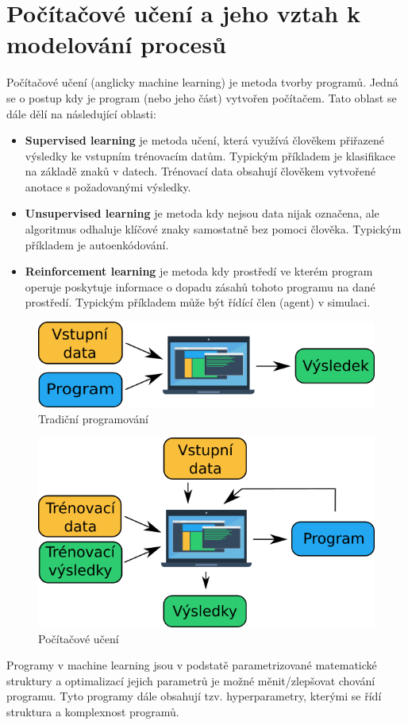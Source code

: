 \section{Počítačové učení a jeho vztah k modelování procesů}
\label{sec:ML}
Počítačové učení (anglicky machine learning) je metoda tvorby programů. Jedná
se o postup kdy je program (nebo jeho část) vytvořen počítačem. Tato oblast se
dále dělí na následující oblasti:
\begin{itemize}
  \item
    \textbf{Supervised learning} je metoda učení, která využívá člověkem
    přiřazené výsledky ke vstupním trénovacím datům. Typickým příkladem je
    klasifikace na základě znaků v datech. Trénovací data obsahují člověkem
    vytvořené anotace s požadovanými výsledky.
  \item
    \textbf{Unsupervised learning} je metoda kdy nejsou data nijak označena,
    ale algoritmus odhaluje klíčové znaky samostatně bez pomoci člověka.
    Typickým příkladem je autoenkódování.
  \item
    \textbf{Reinforcement learning} je metoda kdy prostředí ve kterém program
    operuje poskytuje informace o dopadu zásahů tohoto programu na dané
    prostředí. Typickým příkladem může být řídící člen (agent) v simulaci.
\end{itemize}
\begin{figure}[h] \centering \capstart
  \includegraphics[scale=0.6]{figures/traditional_prog_cz}
  \caption{Tradiční programování}
  \label{fig:traditional_prog}
\end{figure}

\begin{figure}[h] \centering \capstart
  \includegraphics[scale=0.6]{figures/machine_learning_cz}
  \caption{Počítačové učení}
  \label{fig:machine_learning}
\end{figure}
Programy v machine learning jsou v podstatě
parametrizované matematické struktury a optimalizací jejich parametrů je možné
měnit/zlepšovat chování programu. Tyto programy dále obsahují tzv.
hyperparametry, kterými se řídí struktura a komplexnost programů.

